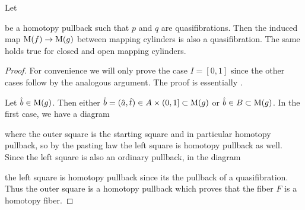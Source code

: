 \begin{lemma}\label{lem:mapOfCylIsQuasiFib}
    Let 
    \begin{center}
    \end{center}
    be a homotopy pullback such that $p$ and $q$ are quasifibrations.
    Then the induced map $\operatorname{M}(f)\to\operatorname{M}(g)$ between mapping cylinders is also a quasifibration.
    The same holds true for closed and open mapping cylinders.
    \begin{proof}
        For convenience we will only prove the case $I=[0,1]$ since the other cases follow by the analogous argument.
        The proof is essentially \cite[Lemma 5.10.6]{cubical_htpy_theory}.

        Let $\hat{b}\in\operatorname{M}(g)$. 
        Then either $\hat{b}=(\hat{a},\hat{t})\in A\times(0,1]\subset\operatorname{M}(g)$ or $\hat{b}\in B\subset\operatorname{M}(g)$.
        In the first case, we have a diagram
        \begin{center}
        \end{center}
        where the outer square is the starting square and in particular homotopy pullback, so by the pasting law the left square is homotopy pullback as well.
        Since the left square is also an ordinary pullback, in the diagram
        \begin{center}
        \end{center}
        the left square is homotopy pullback since its the pullback of a quasifibration.
        Thus the outer square is a homotopy pullback which proves that the fiber $F$ is a homotopy fiber.


\end{proof}
\end{lemma}
